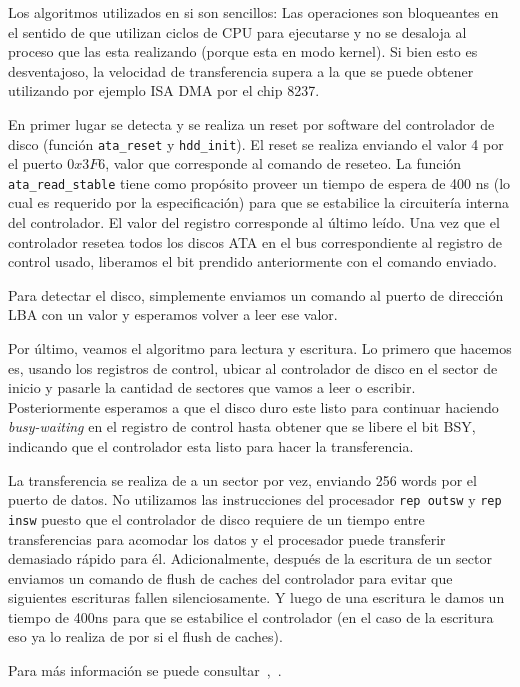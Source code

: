 Los algoritmos utilizados en si son sencillos: Las operaciones son bloqueantes en el sentido de que utilizan ciclos de CPU para ejecutarse y
no se desaloja al proceso que las esta realizando (porque esta en modo kernel). Si bien esto es desventajoso, la velocidad de transferencia
supera a la que se puede obtener utilizando por ejemplo ISA DMA por el chip 8237.

En primer lugar se detecta y se realiza un reset por software del controlador de disco (funci\'on \texttt{ata\_reset} y \texttt{hdd\_init}).
El reset se realiza enviando el valor 4 por el puerto $0x3F6$, valor que corresponde al comando de reseteo. La funci\'on \texttt{ata\_read\_stable} tiene como prop\'osito proveer un tiempo de espera de 400 ns (lo cual es requerido por la especificaci\'on) para que se estabilice la
circuiter\'ia interna del controlador. El valor del registro corresponde al \'ultimo le\'ido. Una vez que el controlador resetea todos los
discos ATA en el bus correspondiente al registro de control usado, liberamos el bit prendido anteriormente con el comando enviado.

Para detectar el disco, simplemente enviamos un comando al puerto de direcci\'on LBA con un valor y esperamos volver a leer ese valor.

Por \'ultimo, veamos el algoritmo para lectura y escritura. Lo primero que hacemos es, usando los registros de control, ubicar al controlador
de disco en el sector de inicio y pasarle la cantidad de sectores que vamos a leer o escribir. Posteriormente esperamos a que el disco duro
este listo para continuar haciendo \textit{busy-waiting} en el registro de control hasta obtener que se libere el bit BSY, indicando que el
controlador esta listo para hacer la transferencia.

La transferencia se realiza de a un sector por vez, enviando 256 words por el puerto de datos. No utilizamos las instrucciones del procesador
\texttt{rep outsw} y \texttt{rep insw} puesto que el controlador de disco requiere de un tiempo entre transferencias para acomodar los datos
y el procesador puede transferir demasiado r\'apido para \'el. Adicionalmente, despu\'es de la escritura de un sector enviamos un comando
de flush de caches del controlador para evitar que siguientes escrituras fallen silenciosamente. Y luego de una escritura le damos un tiempo
de 400ns para que se estabilice el controlador (en el caso de la escritura eso ya lo realiza de por si el flush de caches).

Para m\'as informaci\'on se puede consultar~\cite{ataspec},~\cite{osdev}.
